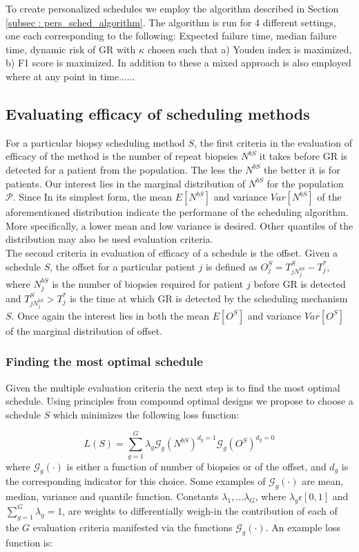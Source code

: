 To create personalized schedules we employ the algorithm described in Section \ref{subsec : pers_sched_algorithm}. The algorithm is run for 4 different settings, one each corresponding to the following: Expected failure time, median failure time, dynamic risk of GR with $\kappa$ chosen such that a) Youden index is maximized, b) F1 score is maximized. In addition to these a mixed approach is also employed where at any point in time......

\subsection{Evaluating efficacy of scheduling methods}
For a particular biopsy scheduling method $S$, the first criteria in the evaluation of efficacy of the method is the number of repeat biopsies $N^{bS}$ it takes before GR is detected for a patient from the population. The less the $N^{bS}$ the better it is for patients. Our interest lies in the marginal distribution of $N^{bS}$ for the population $\mathcal{P}$. Since In its simplest form, the mean $E[N^{bS}]$ and variance $Var[N^{bS}]$ of the aforementioned distribution indicate the performane of the scheduling algorithm. More specifically, a lower mean and low variance is desired. Other quantiles of the distribution may also be used evaluation criteria.\\

The second criteria in evaluation of efficacy of a schedule is the offset. Given a schedule $S$, the offset for a particular patient $j$ is defined as $O^S_j = T^S_{j{N^{bS}_j}} - T^*_j$, where $N^{bS}_j$ is the number of biopsies required for patient $j$ before GR is detected and $T^S_{j{N^{bS}_j}} > T^*_j$ is the time at which GR is detected by the scheduling mechanism $S$. Once again the interest lies in both the mean $E[O^S]$ and variance $Var[O^S]$ of the marginal distribution of offset.

\subsubsection{Finding the most optimal schedule}
Given the multiple evaluation criteria the next step is to find the most optimal schedule. Using principles from compound optimal designs \citep{lauter1976optimal} we propose to choose a schedule $S$ which minimizes the following loss function:

\begin{equation}
\label{eq : loss_func_sim_study_generic}
L(S) = \sum_{g=1}^G \lambda_g \mathcal{G}_g(N^{bS})^{d_g=1}\mathcal{G}_g(O^S)^{d_g=0}
\end{equation}
where $\mathcal{G}_g(\cdot)$ is either a function of number of biopsies or of the offset, and $d_g$ is the corresponding indicator for this choice. Some examples of $\mathcal{G}_g(\cdot)$ are mean, median, variance and quantile function. Constants $\lambda_1, \ldots \lambda_G$, where $\lambda_g \epsilon [0,1]$ and $\sum_{g=1}^G \lambda_g = 1$, are weights to differentially weigh-in the contribution of each of the $G$ evaluation criteria manifested via the functions $\mathcal{G}_g(\cdot)$. An example loss function is:

